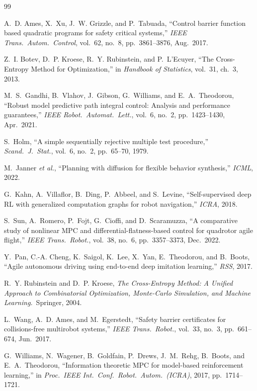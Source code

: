 \documentclass[11pt,onecolumn,a4paper]{article}
\begin{document}
\begin{thebibliography}{99}

A.~D. Ames, X.~Xu, J.~W. Grizzle, and P.~Tabuada, ``Control barrier
function based quadratic programs for safety critical systems,''
\emph{IEEE Trans.\ Autom.\ Control}, vol.~62, no.~8, pp.~3861--3876,
Aug.\ 2017.

Z.~I. Botev, D.~P. Kroese, R.~Y. Rubinstein, and P.~L'Ecuyer, ``The
Cross-Entropy Method for Optimization,'' in \emph{Handbook of
Statistics}, vol.~31, ch.~3, 2013.

M.~S.~Gandhi, B.~Vlahov, J.~Gibson, G.~Williams, and
E.~A.~Theodorou, ``Robust model predictive path integral control:
Analysis and performance guarantees,'' \emph{IEEE Robot.\ Automat.\
Lett.}, vol.~6, no.~2, pp.~1423--1430, Apr.\ 2021.

S.~Holm, ``A simple sequentially rejective multiple test procedure,''
\emph{Scand.\ J.\ Stat.}, vol.~6, no.~2, pp.~65--70, 1979.

M.~Janner \emph{et al.}, ``Planning with diffusion for flexible
behavior synthesis,'' \emph{ICML}, 2022.

G.~Kahn, A.~Villaflor, B.~Ding, P.~Abbeel, and S.~Levine,
``Self-supervised deep RL with generalized computation graphs for
robot navigation,'' \emph{ICRA}, 2018.

S.~Sun, A.~Romero, P.~Fojt, G.~Cioffi, and D.~Scaramuzza, ``A
comparative study of nonlinear MPC and differential-flatness-based
control for quadrotor agile flight,'' \emph{IEEE Trans.\ Robot.},
vol.~38, no.~6, pp.~3357--3373, Dec.\ 2022.

Y.~Pan, C.-A. Cheng, K.~Saigol, K.~Lee, X.~Yan, E.~Theodorou, and
B.~Boots, ``Agile autonomous driving using end-to-end deep imitation
learning,'' \emph{RSS}, 2017.

R.~Y. Rubinstein and D.~P. Kroese, \emph{The Cross-Entropy Method: A
Unified Approach to Combinatorial Optimization, Monte-Carlo
Simulation, and Machine Learning.}\ Springer, 2004.

L.~Wang, A.~D. Ames, and M.~Egerstedt, ``Safety barrier certificates
for collisions-free multirobot systems,'' \emph{IEEE Trans.\ Robot.},
vol.~33, no.~3, pp.~661--674, Jun.\ 2017.

G.~Williams, N.~Wagener, B.~Goldfain, P.~Drews, J.~M.~Rehg,
B.~Boots, and E.~A.~Theodorou, ``Information theoretic MPC for
model-based reinforcement learning,'' in \emph{Proc.\ IEEE Int.\ Conf.\
Robot.\ Autom.\ (ICRA)}, 2017, pp.~1714--1721.


\end{thebibliography}
\end{document}
